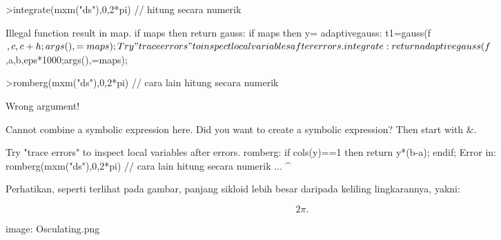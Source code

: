 \documentclass[12pt,arial,letterpaper]{book}
\begin{document}
\begin{eulercomment}
\begin{eulercomment}
\begin{eulercomment}
\begin{eulercomment}
\begin{eulercomment}
\begin{eulercomment}
\begin{eulercomment}
\begin{eulercomment}
\begin{eulercomment}
\begin{eulercomment}
\begin{eulercomment}
\begin{eulercomment}
\begin{eulercomment}
\begin{eulercomment}
\begin{eulercomment}
\begin{eulercomment}
\begin{eulercomment}
\begin{eulercomment}
\begin{eulercomment}
\begin{eulercomment}
\begin{eulercomment}
\begin{eulercomment}
\begin{eulerprompt}
>integrate(mxm("ds"),0,2*pi) // hitung secara numerik
\end{eulerprompt}
\begin{euleroutput}
  Illegal function result in map.
      if maps then return %
  gauss:
      if maps then y=%
  adaptivegauss:
      t1=gauss(f$,c,c+h;args(),=maps);
  Try "trace errors" to inspect local variables after errors.
  integrate:
      return adaptivegauss(f$,a,b,eps*1000;args(),=maps);
\end{euleroutput}
\begin{eulerprompt}
>romberg(mxm("ds"),0,2*pi) // cara lain hitung secara numerik
\end{eulerprompt}
\begin{euleroutput}
  Wrong argument!
  
  Cannot combine a symbolic expression here.
  Did you want to create a symbolic expression?
  Then start with &.
  
  Try "trace errors" to inspect local variables after errors.
  romberg:
      if cols(y)==1 then return y*(b-a); endif;
  Error in:
  romberg(mxm("ds"),0,2*pi) // cara lain hitung secara numerik ...
                           ^
\end{euleroutput}
\begin{eulercomment}
Perhatikan, seperti terlihat pada gambar, panjang sikloid lebih besar
daripada keliling lingkarannya, yakni:

\end{eulercomment}
\begin{eulerformula}
\[
2\pi.
\]
\end{eulerformula}
\begin{eulercomment}
image: Osculating.png


\end{eulercomment}
\end{eulercomment}
\end{eulercomment}
\end{eulercomment}
\end{eulercomment}
\end{eulercomment}
\end{eulercomment}
\end{eulercomment}
\end{eulercomment}
\end{eulercomment}
\end{eulercomment}
\end{eulercomment}
\end{eulercomment}
\end{eulercomment}
\end{eulercomment}
\end{eulercomment}
\end{eulercomment}
\end{eulercomment}
\end{eulercomment}
\end{eulercomment}
\end{eulercomment}
\end{eulercomment}
\end{eulercomment}
\end{document}
